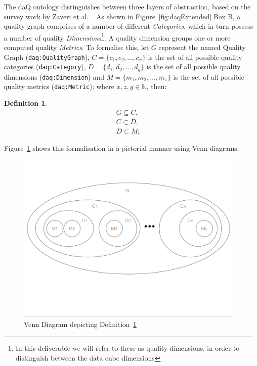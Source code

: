 The daQ ontology distinguishes between three layers of abstraction, based on the survey work by Zaveri et al.~\cite{Zaveri2012:LODQ}.
As shown in Figure~\ref{fig:daqExtended} Box B, a quality graph comprises of a number of different \emph{Categories}, which in turn possess a number of quality \emph{Dimensions}\footnote{In this deliverable we will refer to these as quality dimensions, in order to distinguish between the data cube dimensions}.
A quality dimension groups one or more computed quality \emph{Metrics}.
To formalise this, let $G$ represent the named Quality Graph (\texttt{daq:QualityGraph}), $C = \lbrace c_1, c_2,  \dots , c_x\rbrace$ is the set of all possible quality categories (\texttt{daq:Category}), $D = \lbrace d_1, d_2, \dots , d_y\rbrace$ is the set of all possible quality dimensions (\texttt{daq:Dimension}) and $M = \lbrace m_1, m_2, \dots , m_z\rbrace$ is the set of all possible quality metrics (\texttt{daq:Metric}); where $x,z,y\in \mathbb{N}$, then:

\newtheorem{Def1}{Definition}
\begin{Def1}
\label{def:daq_formalisation}
\begin{align*}
G \subseteq C, \\ 
C \subset D,\\
D \subset M; 
\end{align*}
\end{Def1}

Figure~\ref{fig:venn} shows this formalisation in a pictorial manner using Venn diagrams.

\begin{figure}[tbph]
\center
\includegraphics[scale=0.3]{images/venn.pdf} 
\caption{Venn Diagram depicting Definition~\ref{def:daq_formalisation} }
\label{fig:venn}
\end{figure}

